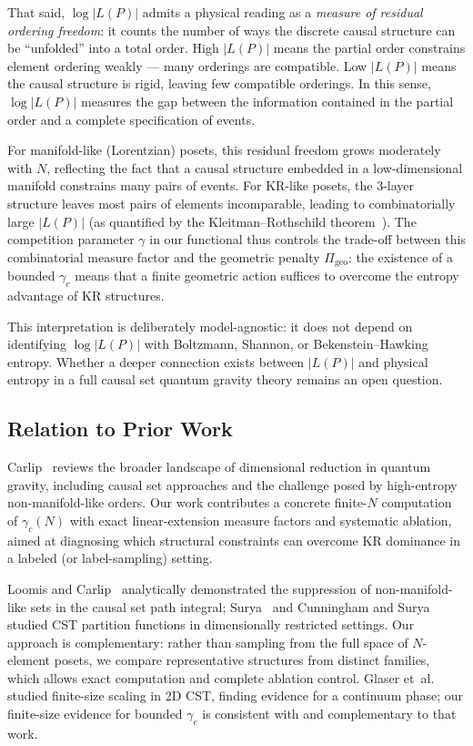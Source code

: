 \documentclass[11pt,a4paper]{article}
\begin{document}
That said, $\log|L(P)|$ admits a physical reading as a \emph{measure of
residual ordering freedom}: it counts the number of ways the discrete causal
structure can be ``unfolded'' into a total order. High $|L(P)|$ means the
partial order constrains element ordering weakly --- many orderings are
compatible. Low $|L(P)|$ means the causal structure is rigid, leaving few
compatible orderings. In this sense, $\log|L(P)|$ measures the gap between the
information contained in the partial order and a complete specification of
events.

For manifold-like (Lorentzian) posets, this residual freedom grows moderately
with $N$, reflecting the fact that a causal structure embedded in a
low-dimensional manifold constrains many pairs of events. For KR-like posets,
the 3-layer structure leaves most pairs of elements incomparable, leading to
combinatorially large $|L(P)|$ (as quantified by the Kleitman--Rothschild
theorem~\cite{kleitman1975}). The competition parameter $\gamma$ in our
functional thus controls the trade-off between this combinatorial measure
factor and the geometric penalty $\Pi_{\mathrm{geo}}$: the existence of a
bounded $\gamma_c$ means that a finite geometric action suffices to overcome the
entropy advantage of KR structures.

This interpretation is deliberately model-agnostic: it does not depend on
identifying $\log|L(P)|$ with Boltzmann, Shannon, or Bekenstein--Hawking
entropy. Whether a deeper connection exists between $|L(P)|$ and physical
entropy in a full causal set quantum gravity theory remains an open question.

\subsection{Relation to Prior Work}

Carlip~\cite{carlip2017} reviews the broader landscape of dimensional
reduction in quantum gravity, including causal set approaches and the challenge
posed by high-entropy non-manifold-like orders. Our work contributes a concrete
finite-$N$ computation of $\gamma_c(N)$ with exact linear-extension measure
factors and systematic ablation, aimed at diagnosing which structural
constraints can overcome KR dominance in a labeled (or label-sampling) setting.

Loomis and Carlip~\cite{loomis2018} analytically demonstrated the suppression of non-manifold-like sets in the causal set path integral; Surya~\cite{surya2012} and Cunningham and Surya~\cite{cunningham2020} studied CST partition functions in dimensionally restricted settings. Our approach is complementary: rather than sampling from the full space of $N$-element posets, we compare representative structures from distinct families, which allows exact computation and complete ablation control. Glaser et~al.~\cite{glaser2018} studied finite-size scaling in 2D CST, finding evidence for a continuum phase; our finite-size evidence for bounded $\gamma_c$ is consistent with and complementary to that work.
\end{document}
